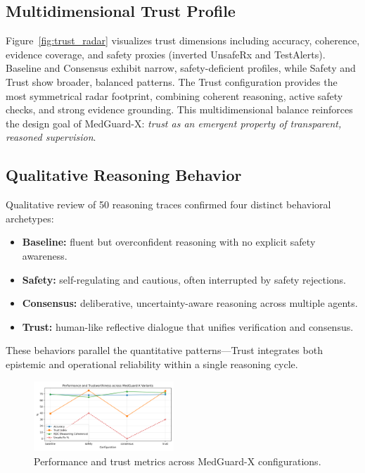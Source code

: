 \documentclass[letterpaper]{article} %
\begin{document}
\subsection{Multidimensional Trust Profile}

Figure~\ref{fig:trust_radar} visualizes trust dimensions including accuracy, coherence, evidence coverage, and safety proxies (inverted UnsafeRx and TestAlerts).  
Baseline and Consensus exhibit narrow, safety-deficient profiles, while Safety and Trust show broader, balanced patterns.  
The Trust configuration provides the most symmetrical radar footprint, combining coherent reasoning, active safety checks, and strong evidence grounding.  
This multidimensional balance reinforces the design goal of MedGuard-X: \emph{trust as an emergent property of transparent, reasoned supervision}.

\subsection{Qualitative Reasoning Behavior}

Qualitative review of 50 reasoning traces confirmed four distinct behavioral archetypes:
\begin{itemize}
    \item \textbf{Baseline:} fluent but overconfident reasoning with no explicit safety awareness.
    \item \textbf{Safety:} self-regulating and cautious, often interrupted by safety rejections.
    \item \textbf{Consensus:} deliberative, uncertainty-aware reasoning across multiple agents.
    \item \textbf{Trust:} human-like reflective dialogue that unifies verification and consensus.
\end{itemize}
These behaviors parallel the quantitative patterns—Trust integrates both epistemic and operational reliability within a single reasoning cycle.
\begin{figure}[t][h]
\centering
\includegraphics[width=0.47\textwidth]{fig1_performance_trust.png}
\caption{Performance and trust metrics across MedGuard-X configurations.}
\label{fig:perf_trust}
\end{figure}
\end{document}
